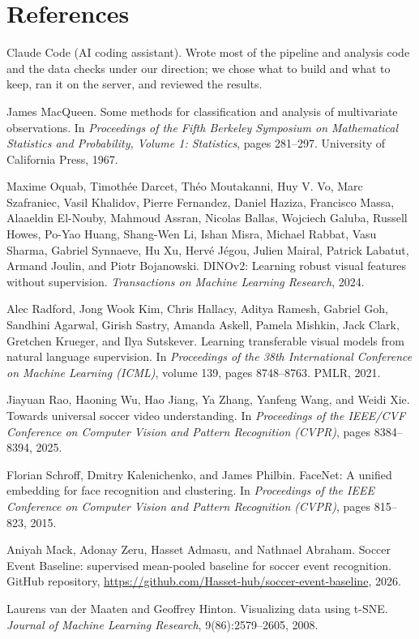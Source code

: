\documentclass[11pt]{article}
\begin{document}
\section*{References}
\begin{enumerate}[label={[\arabic*]}, noitemsep]
  \item Claude Code (AI coding assistant). Wrote most of the pipeline and analysis code and the data checks
        under our direction; we chose what to build and what to keep, ran it on the server, and reviewed
        the results.
  \item James MacQueen. Some methods for classification and analysis of multivariate observations. In
        \emph{Proceedings of the Fifth Berkeley Symposium on Mathematical Statistics and Probability, Volume 1:
        Statistics}, pages 281--297. University of California Press, 1967.
  \item Maxime Oquab, Timoth\'ee Darcet, Th\'eo Moutakanni, Huy V. Vo, Marc Szafraniec, Vasil Khalidov, Pierre
        Fernandez, Daniel Haziza, Francisco Massa, Alaaeldin El-Nouby, Mahmoud Assran, Nicolas Ballas, Wojciech
        Galuba, Russell Howes, Po-Yao Huang, Shang-Wen Li, Ishan Misra, Michael Rabbat, Vasu Sharma, Gabriel
        Synnaeve, Hu Xu, Herv\'e J\'egou, Julien Mairal, Patrick Labatut, Armand Joulin, and Piotr Bojanowski.
        DINOv2: Learning robust visual features without supervision. \emph{Transactions on Machine Learning
        Research}, 2024.
  \item Alec Radford, Jong Wook Kim, Chris Hallacy, Aditya Ramesh, Gabriel Goh, Sandhini Agarwal, Girish Sastry,
        Amanda Askell, Pamela Mishkin, Jack Clark, Gretchen Krueger, and Ilya Sutskever. Learning transferable
        visual models from natural language supervision. In \emph{Proceedings of the 38th International
        Conference on Machine Learning (ICML)}, volume 139, pages 8748--8763. PMLR, 2021.
  \item Jiayuan Rao, Haoning Wu, Hao Jiang, Ya Zhang, Yanfeng Wang, and Weidi Xie. Towards universal soccer
        video understanding. In \emph{Proceedings of the IEEE/CVF Conference on Computer Vision and Pattern
        Recognition (CVPR)}, pages 8384--8394, 2025.
  \item Florian Schroff, Dmitry Kalenichenko, and James Philbin. FaceNet: A unified embedding for face
        recognition and clustering. In \emph{Proceedings of the IEEE Conference on Computer Vision and Pattern
        Recognition (CVPR)}, pages 815--823, 2015.
  \item Aniyah Mack, Adonay Zeru, Hasset Admasu, and Nathnael Abraham. Soccer Event Baseline: supervised
        mean-pooled baseline for soccer event recognition. GitHub repository,
        \url{https://github.com/Hasset-hub/soccer-event-baseline}, 2026.
  \item Laurens van der Maaten and Geoffrey Hinton. Visualizing data using t-SNE. \emph{Journal of Machine
        Learning Research}, 9(86):2579--2605, 2008.
\end{enumerate}
\end{document}
